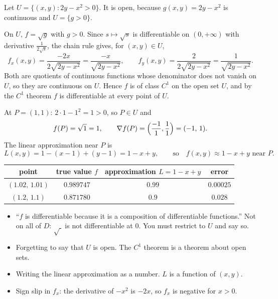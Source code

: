 \begin{answer}
Let $U=\{(x,y):2y-x^2>0\}$. It is open, because $g(x,y)=2y-x^2$ is continuous and $U=\{g>0\}$.

On $U$, $f=\sqrt{g}$ with $g>0$. Since $s\mapsto\sqrt s$ is differentiable on $(0,+\infty)$ with
derivative $\frac1{2\sqrt s}$, the chain rule gives, for $(x,y)\in U$,
\[
  f_x(x,y)=\frac{-2x}{2\sqrt{2y-x^2}}=\frac{-x}{\sqrt{2y-x^2}},\qquad
  f_y(x,y)=\frac{2}{2\sqrt{2y-x^2}}=\frac{1}{\sqrt{2y-x^2}} .
\]
Both are quotients of continuous functions whose denominator does not vanish on $U$, so they are
continuous on $U$. Hence $f$ is of class $C^1$ on the open set $U$, and by the $C^1$ theorem $f$
is differentiable at every point of $U$.

At $P=(1,1)$: $2\cdot1-1^2=1>0$, so $P\in U$ and
\[
  f(P)=\sqrt1=1,\qquad \nabla f(P)=\Big(\frac{-1}{1},\frac{1}{1}\Big)=(-1,\,1).
\]
The linear approximation near $P$ is
\[
  L(x,y)=1-(x-1)+(y-1)=1-x+y,\qquad\text{so}\quad f(x,y)\approx 1-x+y \text{ near } P.
\]
\end{answer}

\begin{center}\small
\begin{tabular}{@{}cccc@{}}\toprule
point & true value $f$ & approximation $L=1-x+y$ & error\\ \midrule
$(1.02,\,1.01)$ & $0.989747$ & $0.99$ & $0.00025$\\
$(1.2,\,1.1)$ & $0.871780$ & $0.9$ & $0.028$\\ \bottomrule
\end{tabular}
\end{center}

\begin{trap}
\begin{itemize}
  \item ``$f$ is differentiable because it is a composition of differentiable functions.'' Not on
        all of $D$: $\sqrt{\ }$ is not differentiable at $0$. You must restrict to $U$ and say so.
  \item Forgetting to say that $U$ is open. The $C^1$ theorem is a theorem about open sets.
  \item Writing the linear approximation as a number. $L$ is a function of $(x,y)$.
  \item Sign slip in $f_x$: the derivative of $-x^2$ is $-2x$, so $f_x$ is negative for $x>0$.
\end{itemize}
\end{trap}

